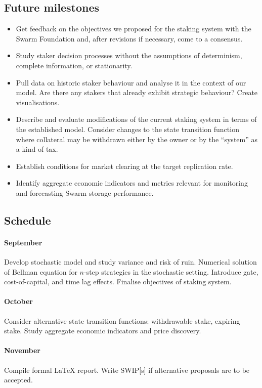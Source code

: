 \subsection*{Future milestones}
\begin{itemize}
  \item Get feedback on the objectives we proposed for the staking system with the Swarm Foundation and, after revisions if necessary, come to a consensus.
  \item Study staker decision processes without the assumptions of determinism, complete information, or stationarity.
  \item Pull data on historic staker behaviour and analyse it in the context of our model. Are there any stakers that already exhibit strategic behaviour? Create visualisations.
  \item Describe and evaluate modifications of the current staking system in terms of the established model. Consider changes to the state transition function where collateral may be withdrawn either by the owner or by the ``system'' as a kind of tax.
  \item Establish conditions for market clearing at the target replication rate.
  \item Identify aggregate economic indicators and metrics relevant for monitoring and forecasting Swarm storage performance.
\end{itemize}

\subsection*{Schedule}

\paragraph{September} Develop stochastic model and study variance and risk of ruin. 
%
Numerical solution of Bellman equation for $n$-step strategies in the stochastic setting. 
%
Introduce gate, cost-of-capital, and time lag effects. 
%
Finalise objectives of staking system.

\paragraph{October} 
Consider alternative state transition functions: withdrawable stake, expiring stake.
%
Study aggregate economic indicators and price discovery.

\paragraph{November} Compile formal LaTeX report. Write SWIP[s] if alternative proposals are to be accepted.


